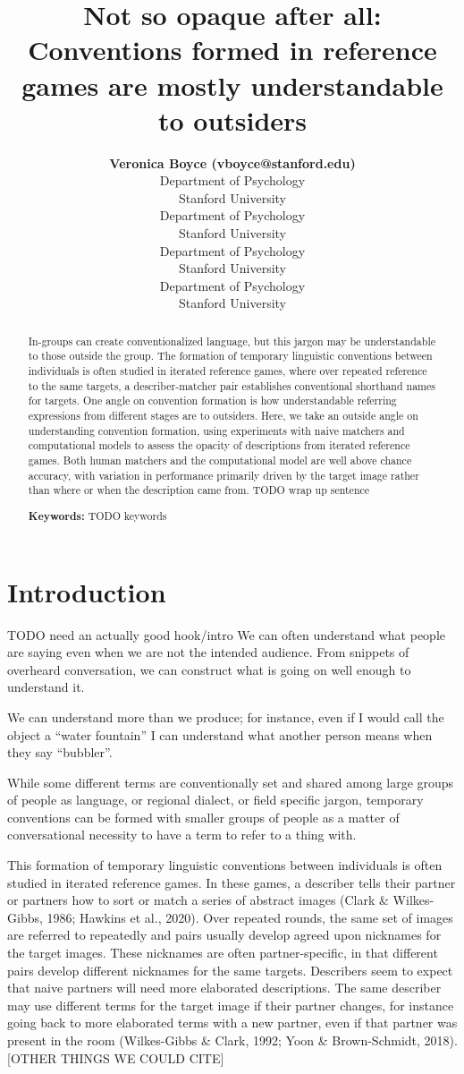 \documentclass[10pt, letterpaper]{article}
\title{Not so opaque after all: Conventions formed in reference games
are mostly understandable to outsiders}
\author{{\large \bf Veronica Boyce (vboyce@stanford.edu)} \\ Department of Psychology \\ Stanford University \And {\large \bf Ben Prystawski (benpry@stanford.edu)} \\Department of Psychology \\ Stanford University \AND {\large \bf Alvin Wei Ming Tan (tanawm@stanford.edu)} \\ Department of Psychology \\ Stanford University \And {\large \bf Michael C. Frank (mcfrank@stanford.edu)} \\ Department of Psychology \\ Stanford University}
\begin{document}
\maketitle

\begin{abstract}
In-groups can create conventionalized language, but this jargon may be
understandable to those outside the group. The formation of temporary
linguistic conventions between individuals is often studied in iterated
reference games, where over repeated reference to the same targets, a
describer-matcher pair establishes conventional shorthand names for
targets. One angle on convention formation is how understandable
referring expressions from different stages are to outsiders. Here, we
take an outside angle on understanding convention formation, using
experiments with naive matchers and computational models to assess the
opacity of descriptions from iterated reference games. Both human
matchers and the computational model are well above chance accuracy,
with variation in performance primarily driven by the target image
rather than where or when the description came from. TODO wrap up
sentence

\textbf{Keywords:}
TODO keywords
\end{abstract}

\section{Introduction}\label{introduction}

TODO need an actually good hook/intro We can often understand what
people are saying even when we are not the intended audience. From
snippets of overheard conversation, we can construct what is going on
well enough to understand it.

We can understand more than we produce; for instance, even if I would
call the object a ``water fountain'' I can understand what another
person means when they say ``bubbler''.

While some different terms are conventionally set and shared among large
groups of people as language, or regional dialect, or field specific
jargon, temporary conventions can be formed with smaller groups of
people as a matter of conversational necessity to have a term to refer
to a thing with.

This formation of temporary linguistic conventions between individuals
is often studied in iterated reference games. In these games, a
describer tells their partner or partners how to sort or match a series
of abstract images (Clark \& Wilkes-Gibbs, 1986; Hawkins et al., 2020).
Over repeated rounds, the same set of images are referred to repeatedly
and pairs usually develop agreed upon nicknames for the target images.
These nicknames are often partner-specific, in that different pairs
develop different nicknames for the same targets. Describers seem to
expect that naive partners will need more elaborated descriptions. The
same describer may use different terms for the target image if their
partner changes, for instance going back to more elaborated terms with a
new partner, even if that partner was present in the room (Wilkes-Gibbs
\& Clark, 1992; Yoon \& Brown-Schmidt, 2018). {[}OTHER THINGS WE COULD
CITE{]}
\end{document}
